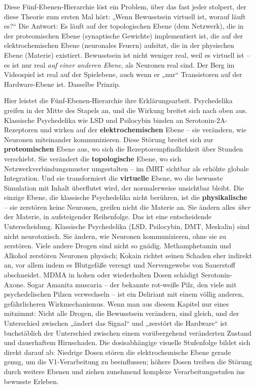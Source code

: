 \documentclass[11pt, twoside, openright]{book}
\begin{document}
Diese Fünf-Ebenen-Hierarchie löst ein Problem, über das fast jeder stolpert, der diese Theorie zum ersten Mal hört: „Wenn Bewusstsein virtuell ist, worauf läuft es?“ Die Antwort: Es läuft auf der topologischen Ebene (dem Netzwerk), die in der proteomischen Ebene (synaptische Gewichte) implementiert ist, die auf der elektrochemischen Ebene (neuronales Feuern) aufsitzt, die in der physischen Ebene (Materie) existiert. Bewusstsein ist nicht weniger real, weil es virtuell ist -- es ist nur real \textit{auf einer anderen Ebene}, als Neuronen real sind. Der Berg im Videospiel ist real auf der Spielebene, auch wenn er „nur“ Transistoren auf der Hardware-Ebene ist. Dasselbe Prinzip.

Hier leistet die Fünf-Ebenen-Hierarchie ihre Erklärungsarbeit. Psychedelika greifen in der Mitte des Stapels an, und die Wirkung breitet sich nach oben aus. Klassische Psychedelika wie LSD und Psilocybin binden an Serotonin-2A-Rezeptoren und wirken auf der \textbf{elektrochemischen} Ebene -- sie verändern, wie Neuronen miteinander kommunizieren. Diese Störung breitet sich zur \textbf{proteomischen} Ebene aus, wo sich die Rezeptorempfindlichkeit über Stunden verschiebt. Sie verändert die \textbf{topologische} Ebene, wo sich Netzwerkverbindungsmuster umgestalten -- im fMRT sichtbar als erhöhte globale Integration. Und sie transformiert die \textbf{virtuelle} Ebene, wo die bewusste Simulation mit Inhalt überflutet wird, der normalerweise unsichtbar bleibt. Die einzige Ebene, die klassische Psychedelika nicht berühren, ist die \textbf{physikalische} -- sie zerstören keine Neuronen, greifen nicht die Materie an. Sie ändern alles \textit{über} der Materie, in aufsteigender Reihenfolge. Das ist eine entscheidende Unterscheidung. Klassische Psychedelika (LSD, Psilocybin, DMT, Meskalin) sind nicht neurotoxisch. Sie ändern, wie Neuronen kommunizieren, ohne sie zu zerstören. Viele andere Drogen sind nicht so gnädig. Methamphetamin und Alkohol zerstören Neuronen physisch; Kokain richtet seinen Schaden eher indirekt an, vor allem indem es Blutgefäße verengt und Nervengewebe von Sauerstoff abschneidet. MDMA in hohen oder wiederholten Dosen schädigt Serotonin-Axone. Sogar Amanita muscaria -- der bekannte rot-weiße Pilz, den viele mit psychedelischen Pilzen verwechseln -- ist ein Deliriant mit einem völlig anderen, gefährlicheren Wirkmechanismus. Wenn man aus diesem Kapitel nur eines mitnimmt: Nicht alle Drogen, die Bewusstsein verändern, sind gleich, und der Unterschied zwischen „ändert das Signal“ und „zerstört die Hardware“ ist buchstäblich der Unterschied zwischen einem vorübergehend veränderten Zustand und dauerhaftem Hirnschaden. Die dosisabhängige visuelle Stufenfolge bildet sich direkt darauf ab: Niedrige Dosen stören die elektrochemische Ebene gerade genug, um die V1-Verarbeitung zu beeinflussen; höhere Dosen treiben die Störung durch weitere Ebenen und ziehen zunehmend komplexe Verarbeitungsstufen ins bewusste Erleben.
\end{document}
